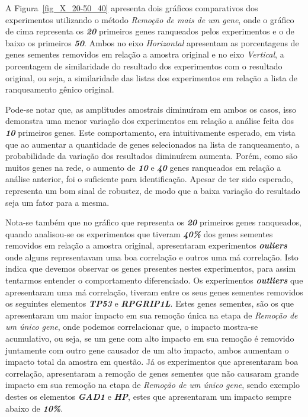 %
A Figura~\ref{fig_X_20-50_40} apresenta dois gráficos comparativos dos experimentos utilizando o método \textsl{Remoção de mais de um gene}, onde o gráfico de cima representa os \textsl{\textbf{20}} primeiros genes ranqueados pelos experimentos e o de baixo os primeiros \textsl{\textbf{50}}. Ambos no eixo \textsl{Horizontal} apresentam as porcentagens de genes sementes removidos em relação a amostra original e no eixo \textsl{Vertical}, a porcentagem de similaridade do resultado dos experimentos com o resultado original, ou seja, a similaridade das listas dos experimentos em relação a lista de ranqueamento gênico original.
%

Pode-se notar que, as amplitudes amostrais diminuíram em ambos os casos, isso demonstra uma menor variação dos experimentos em relação a análise feita dos \textsl{\textbf{10}} primeiros genes. Este comportamento, era intuitivamente esperado, em vista que ao aumentar a quantidade de genes selecionados na lista de ranqueamento, a probabilidade da variação dos resultados diminuírem aumenta. Porém, como são muitos genes na rede, o aumento de \textsl{\textbf{10}} e \textsl{\textbf{40}} genes ranqueados em relação a análise anterior, foi o suficiente para identificação. Apesar de ter sido esperado, representa um bom sinal de robustez, de modo que a baixa variação do resultado seja um fator para a mesma.
%

Nota-se também que no gráfico que representa os \textsl{\textbf{20}} primeiros genes ranqueados, quando analisou-se os experimentos que tiveram \textsl{\textbf{40\%}} dos genes sementes removidos em relação a amostra original, apresentaram experimentos \textsl{\textbf{ouliers}} onde alguns representavam uma boa correlação e outros uma má correlação. Isto indica que devemos observar os genes presentes nestes experimentos, para assim tentarmos entender o comportamento diferenciado. Os experimentos \textsl{\textbf{outliers}} que apresentaram uma má correlação, tiveram entre os seus genes sementes removidos os seguintes elementos \textsl{\textbf{TP53}} e \textsl{\textbf{RPGRIP1L}}. Estes genes sementes, são os que apresentaram um maior impacto em sua remoção única na etapa de \textsl{Remoção de um único gene}, onde podemos correlacionar que, o impacto mostra-se acumulativo, ou seja, se um gene com alto impacto em sua remoção é removido juntamente com outro gene causador de um alto impacto, ambos aumentam o impacto total da amostra em questão. Já os experimentos que apresentaram boa correlação, apresentaram a remoção de genes sementes que não causaram grande impacto em sua remoção na etapa de \textsl{Remoção de um único gene}, sendo exemplo destes os elementos \textsl{\textbf{GAD1}} e \textsl{\textbf{HP}}, estes que apresentaram um impacto sempre abaixo de \textsl{\textbf{10\%}}.   
%

